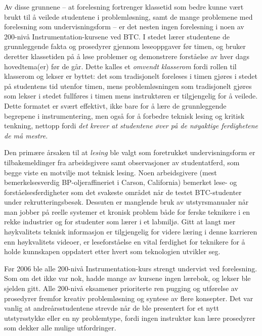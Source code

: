\vskip 10pt

Av disse grunnene -- at forelesning fortrenger klassetid som bedre kunne vært brukt til å veilede studentene i problemløsning, samt de mange problemene med forelesning som undervisningsform -- er det nesten ingen forelesning i noen av 200-nivå Instrumentation-kursene ved BTC.  I stedet lærer studentene de grunnleggende fakta og prosedyrer gjennom leseoppgaver før timen, og bruker deretter klassetiden på å løse problemer og demonstrere forståelse av hver dags hovedtema(er) før de går.  Dette kalles et {\it omvendt klasserom} fordi rollen til klasserom og lekser er byttet: det som tradisjonelt foreleses i timen gjøres i stedet på studentens tid utenfor timen, mens problemløsningen som tradisjonelt gjøres som lekser i stedet fullføres i timen mens instruktøren er tilgjengelig for å veilede.  Dette formatet er svært effektivt, ikke bare for å lære de grunnleggende begrepene i instrumentering, men også for å forbedre teknisk lesing og kritisk tenkning, nettopp fordi {\it det krever at studentene øver på de nøyaktige ferdighetene de må mestre}.

Den primære årsaken til at {\it lesing} ble valgt som foretrukket undervisningsform er tilbakemeldinger fra arbeidsgivere samt observasjoner av studentatferd, som begge viste en motvilje mot teknisk lesing.  Noen arbeidsgivere (mest bemerkelsesverdig BP-oljeraffineriet i Carson, California) bemerket lese- og forståelsesferdigheter som det svakeste området når de testet BTC-studenter under rekrutteringsbesøk.  Dessuten er manglende bruk av utstyrsmanualer når man jobber på reelle systemer et kronisk problem både for ferske teknikere i en rekke industrier og for studenter som lærer i et labmiljø.  Gitt at langt mer høykvalitets teknisk informasjon er tilgjengelig for videre læring i denne karrieren enn høykvalitets videoer, er leseforståelse en vital ferdighet for teknikere for å holde kunnskapen oppdatert etter hvert som teknologien utvikler seg.

\vfil \eject

Før 2006 ble alle 200-nivå Instrumentation-kurs strengt undervist ved forelesning.  Som om det ikke var nok, hadde mange av kursene ingen lærebok, og lekser ble sjelden gitt.  Alle 200-nivå eksamener prioriterte ren pugging og utførelse av prosedyrer fremfor kreativ problemløsning og syntese av flere konsepter.  Det var vanlig at andreårsstudentene strevde når de ble presentert for et nytt utstyrsstykke eller en ny problemtype, fordi ingen instruktør kan lære prosedyrer som dekker alle mulige utfordringer.

